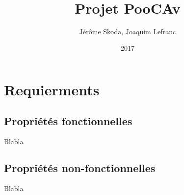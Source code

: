 \documentclass[12pt]{article}
\title{Projet PooCAv}
\author{Jérôme Skoda, Joaquim Lefranc}
\date{2017}
\begin{document}
\maketitle
\section{Requierments}

\subsection{Propriétés fonctionnelles}
Blabla

\subsection{Propriétés non-fonctionnelles}
Blabla
\end{document}
